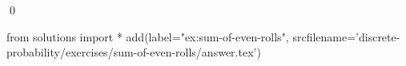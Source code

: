 
\begin{ex} 
  \label{ex:sum-of-even-rolls}
  
  \qed
\end{ex} 
\begin{python0}
from solutions import *
add(label="ex:sum-of-even-rolls",
    srcfilename='discrete-probability/exercises/sum-of-even-rolls/answer.tex') 
\end{python0}

